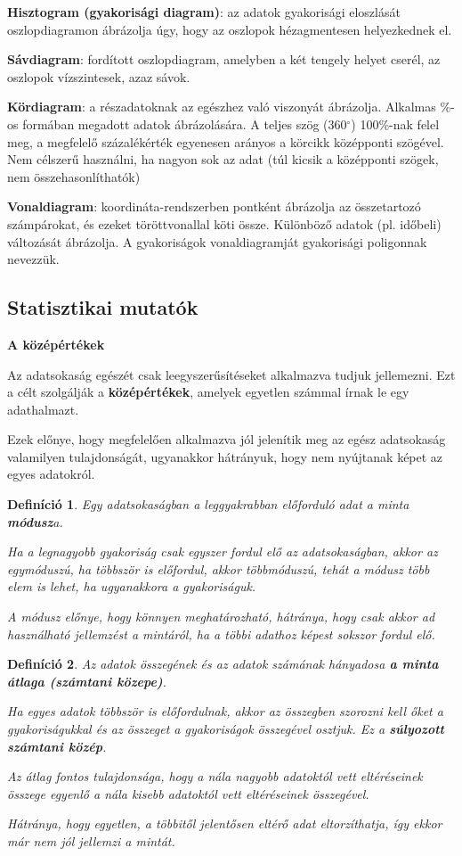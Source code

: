 \documentclass[12pt,a4paper]{article}
\newtheorem{definition}{Definíció} [section]
\begin{document}
\textbf{Hisztogram (gyakorisági diagram)}: az adatok gyakorisági eloszlását oszlopdiagramon ábrázolja úgy, hogy az oszlopok hézagmentesen helyezkednek el.

\textbf{Sávdiagram}: fordított oszlopdiagram, amelyben a két tengely helyet cserél, az oszlopok vízszintesek, azaz sávok.

\textbf{Kördiagram}: a részadatoknak az egészhez való viszonyát ábrázolja. Alkalmas \%-os formában megadott adatok ábrázolására. A teljes szög (360$^\circ$) 100\%-nak felel meg, a megfelelő százalékérték egyenesen arányos a körcikk középponti szögével. Nem célszerű használni, ha nagyon sok az adat (túl kicsik a középponti szögek, nem összehasonlíthatók)

\textbf{Vonaldiagram}: koordináta-rendszerben pontként ábrázolja az összetartozó számpárokat, és ezeket töröttvonallal köti össze. Különböző adatok (pl. időbeli) változását ábrázolja. A gyakoriságok vonaldiagramját gyakorisági poligonnak nevezzük.

\subsection{Statisztikai mutatók}
\textbf{A középértékek}

Az adatsokaság egészét csak leegyszerűsítéseket alkalmazva tudjuk jellemezni. Ezt a célt szolgálják a \textbf{középértékek}, amelyek egyetlen számmal írnak le egy adathalmazt.

Ezek előnye, hogy megfelelően alkalmazva jól jelenítik meg az egész adatsokaság valamilyen tulajdonságát, ugyanakkor hátrányuk, hogy nem nyújtanak képet az egyes adatokról.

\begin{definition}
Egy adatsokaságban a leggyakrabban előforduló adat a minta \textbf{módusz}a.

Ha a legnagyobb gyakoriság csak egyszer fordul elő az adatsokaságban, akkor az egymóduszú, ha többször is előfordul, akkor többmóduszú, tehát a módusz több elem is lehet, ha ugyanakkora a gyakoriságuk.

A módusz előnye, hogy könnyen meghatározható, hátránya, hogy csak akkor ad használható
jellemzést a mintáról, ha a többi adathoz képest sokszor fordul elő.
\end{definition}

\begin{definition}
Az adatok összegének és az adatok számának hányadosa \textbf{a minta átlaga (számtani közepe)}.

Ha egyes adatok többször is előfordulnak, akkor az összegben szorozni kell őket a gyakoriságukkal és az összeget a gyakoriságok összegével osztjuk. Ez a \textbf{súlyozott számtani közép}.

Az átlag fontos tulajdonsága, hogy a nála nagyobb adatoktól vett eltéréseinek összege
egyenlő a nála kisebb adatoktól vett eltéréseinek összegével.

Hátránya, hogy egyetlen, a többitől jelentősen eltérő adat eltorzíthatja, így ekkor már nem jól
jellemzi a mintát.
\end{definition}
\end{document}
